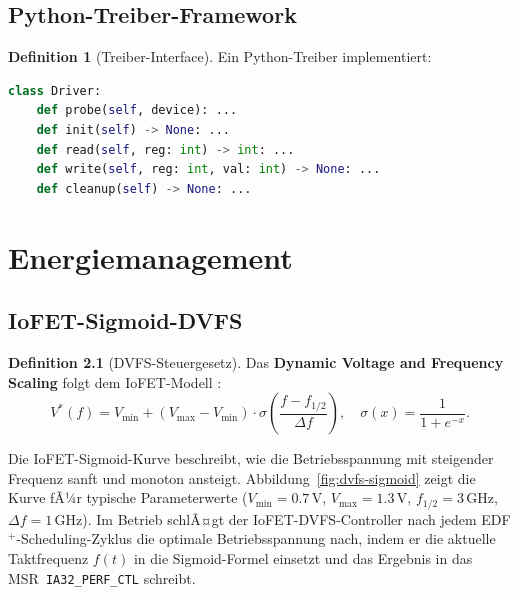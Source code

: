 ﻿\documentclass[a4paper,12pt]{scrreprt}
\theoremstyle{definition}
\newtheorem{definition}{Definition}[chapter]
\begin{document}
	\section{Python-Treiber-Framework}
	
	\begin{definition}[Treiber-Interface]
		Ein Python-Treiber implementiert:
		\begin{lstlisting}[language=Python]
class Driver:
	def probe(self, device): ...
	def init(self) -> None: ...
	def read(self, reg: int) -> int: ...
	def write(self, reg: int, val: int) -> None: ...
	def cleanup(self) -> None: ...
		\end{lstlisting}
	\end{definition}
	
	\chapter{Energiemanagement}
	
	\section{IoFET-Sigmoid-DVFS}

	\begin{definition}[DVFS-Steuergesetz]
		Das \textbf{Dynamic Voltage and Frequency Scaling} folgt dem
		IoFET-Modell \cite{Epp2026iono}:
		\[
		V^*(f) = V_{\min} + (V_{\max} - V_{\min}) \cdot
		\sigma\!\left(\frac{f - f_{1/2}}{\Delta f}\right),
		\quad
		\sigma(x) = \frac{1}{1 + e^{-x}}.
		\]
	\end{definition}

	Die IoFET-Sigmoid-Kurve beschreibt, wie die Betriebsspannung mit
	steigender Frequenz sanft und monoton ansteigt. Abbildung~\ref{fig:dvfs-sigmoid}
	zeigt die Kurve fÃ¼r typische Parameterwerte ($V_{\min} = 0.7\,\text{V}$,
	$V_{\max} = 1.3\,\text{V}$, $f_{1/2} = 3\,\text{GHz}$, $\Delta f = 1\,\text{GHz}$).
	Im Betrieb schlÃ¤gt der IoFET-DVFS-Controller nach jedem EDF$^+$-Scheduling-Zyklus
	die optimale Betriebsspannung nach, indem er die aktuelle Taktfrequenz $f(t)$
	in die Sigmoid-Formel einsetzt und das Ergebnis in das MSR~\texttt{IA32\_PERF\_CTL}
	schreibt.
\end{document}

